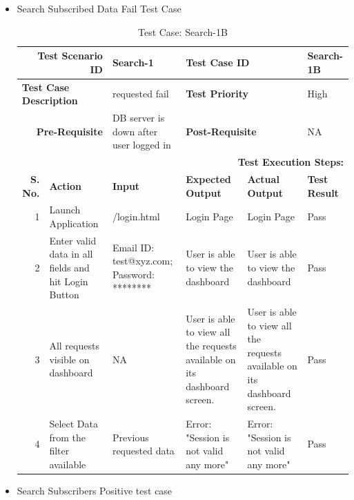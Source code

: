 \documentclass[a4paper, hidelinks, 12pt]{report}
\begin{document}
\begin{itemize}
\item{Search Subscribed Data Fail Test Case}
\begin{table}[H]
  \centering
  \caption{Test Case: Search-1B}
    \begin{tabular}{|r|p{4.355em}|p{7.715em}|p{6.43em}|p{5.855em}|p{5.07em}|}
    \toprule
    \multicolumn{2}{|p{13.425em}|}{\textbf{Test Scenario ID}} & Search-1 & \multicolumn{2}{p{12.285em}|}{\textbf{Test Case ID}} & Search-1B \\
    \midrule
    \multicolumn{2}{|l|}{\multirow{2}[2]{*}{\textbf{Test Case Description}}} & \multirow{2}[2]{*}{requested fail} & \multicolumn{2}{l|}{\multirow{2}[2]{*}{\textbf{Test Priority}}} & \multirow{2}[2]{*}{High} \\
    \multicolumn{2}{|l|}{} & \multicolumn{1}{l|}{} & \multicolumn{2}{l|}{} & \multicolumn{1}{l|}{} \\
    \midrule
    \multicolumn{2}{|p{13.425em}|}{\textbf{Pre-Requisite}} & DB server is down after user logged in & \multicolumn{2}{p{12.285em}|}{\textbf{Post-Requisite}} & NA \\
    \midrule
    \multicolumn{6}{p{38.495em}|}{\textbf{Test Execution Steps:}} \\
    \midrule
    \multicolumn{1}{|p{5.07em}|}{\textbf{S. No.}} & \textbf{Action } & \textbf{Input} & \textbf{Expected Output} & \textbf{Actual Output} & \textbf{Test Result} \\
    \midrule
    1     & Launch Application & /login.html & Login Page & Login Page & Pass \\
    \midrule
    2     & Enter valid data in all fields and hit Login Button & Email ID: test@xyz.com; Password: ******** & User is able to view the dashboard & User is able to view the dashboard & Pass \\
    \midrule
    3     & All requests visible on dashboard & NA    & User is able to view all the requests available on its dashboard screen. & User is able to view all the requests available on its dashboard screen. & Pass \\
    \midrule
    4     & Select Data from the filter available & Previous requested data & Error: "Session is not valid any more" & Error: "Session is not valid any more" & Pass \\
    \bottomrule
    \end{tabular}%
  \label{tab:Test Case: Search-1B}%
\end{table}%
\item{Search Subscribers Positive test case}

\end{itemize}
\end{document}
